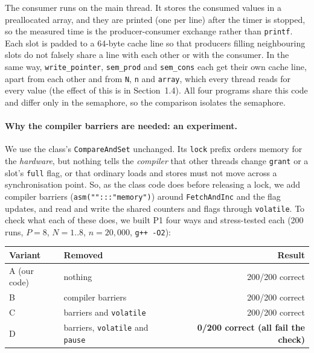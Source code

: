 \documentclass[10pt,a4paper]{article}
\begin{document}
The consumer runs on the main thread. It stores the consumed values in a preallocated array, and they are printed (one per line) after the timer is stopped,
so the measured time is the producer-consumer exchange rather than \texttt{printf}.
Each slot is padded to a 64-byte cache line so that producers filling neighbouring slots do not falsely share a line with each other or with the consumer.
In the same way, \texttt{write\_pointer}, \texttt{sem\_prod} and \texttt{sem\_cons} each get their own cache line, apart from each other and from \texttt{N}, \texttt{n} and \texttt{array},
which every thread reads for every value (the effect of this is in Section~1.4).
All four programs share this code and differ only in the semaphore, so the comparison isolates the semaphore.

\paragraph{Why the compiler barriers are needed: an experiment.}
We use the class's \texttt{CompareAndSet} unchanged. Its \texttt{lock} prefix orders memory for the \emph{hardware}, but nothing tells the \emph{compiler}
that other threads change \texttt{grant} or a slot's \texttt{full} flag, or that ordinary loads and stores must not move across a synchronisation point.
So, as the class code does before releasing a lock, we add compiler barriers (\texttt{asm("":::"memory")}) around \texttt{FetchAndInc} and the flag updates,
and read and write the shared counters and flags through \texttt{volatile}. To check what each of these does, we built P1 four ways and stress-tested each
(200 runs, $P=8$, $N=1..8$, $n=20{,}000$, \texttt{g++ -O2}):

\begin{center}\small
\begin{tabular}{llr}
\toprule
Variant & Removed & Result \\
\midrule
A (our code) & nothing & 200/200 correct \\
B & compiler barriers & 200/200 correct \\
C & barriers and \texttt{volatile} & 200/200 correct \\
D & barriers, \texttt{volatile} and \texttt{pause} & \textbf{0/200 correct (all fail the check)} \\
\bottomrule
\end{tabular}
\end{center}
\end{document}
